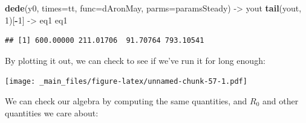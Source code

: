 \documentclass[
]{book}
\newenvironment{Shaded}{\begin{snugshade}}{\end{snugshade}}
\newcommand{\AttributeTok}[1]{\textcolor[rgb]{0.13,0.29,0.53}{#1}}
\newcommand{\DecValTok}[1]{\textcolor[rgb]{0.00,0.00,0.81}{#1}}
\newcommand{\FunctionTok}[1]{\textcolor[rgb]{0.13,0.29,0.53}{\textbf{#1}}}
\newcommand{\NormalTok}[1]{#1}
\newcommand{\OtherTok}[1]{\textcolor[rgb]{0.56,0.35,0.01}{#1}}
\newcommand{\SpecialCharTok}[1]{\textcolor[rgb]{0.81,0.36,0.00}{\textbf{#1}}}
\begin{document}
\begin{Shaded}
\begin{Highlighting}[]
\FunctionTok{dede}\NormalTok{(y0, }\AttributeTok{times=}\NormalTok{tt, }\AttributeTok{func=}\NormalTok{dAronMay, }\AttributeTok{parms=}\NormalTok{paramsSteady) }\OtherTok{{-}\textgreater{}}\NormalTok{ yout}
\FunctionTok{tail}\NormalTok{(yout, }\DecValTok{1}\NormalTok{)[}\SpecialCharTok{{-}}\DecValTok{1}\NormalTok{] }\OtherTok{{-}\textgreater{}}\NormalTok{ eq1 }
\NormalTok{eq1}
\end{Highlighting}
\end{Shaded}

\begin{verbatim}
## [1] 600.00000 211.01706  91.70764 793.10541
\end{verbatim}

By plotting it out, we can check to see if we've run it for long enough:

\texttt{[image: \_main\_files/figure-latex/unnamed-chunk-57-1.pdf]}

We can check our algebra by computing the same quantities, and \(R_0\) and other quantities we care about:
\end{document}
